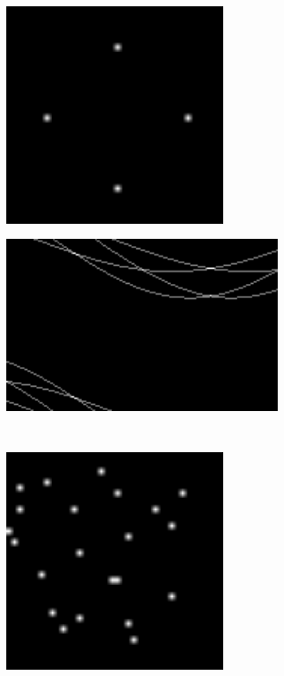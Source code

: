 \documentclass[12pt
,headinclude
,headsepline
,bibtotocnumbered
]{scrartcl}
\begin{document}
\begin{figure}[h]
\begin{subfigure}{0.45\textwidth}
        \includegraphics[width=0.8\textwidth]{plots/test2.png}
    \end{subfigure}
    \hfill
    \begin{subfigure}{0.45\textwidth}
        \includegraphics[width=1.25\textwidth]{plots/test2_hough.png}
    \end{subfigure}
    \\
    \begin{subfigure}{0.45\textwidth}
        \includegraphics[width=0.8\textwidth]{plots/test3.png}

\end{subfigure}
\end{figure}
\end{document}
